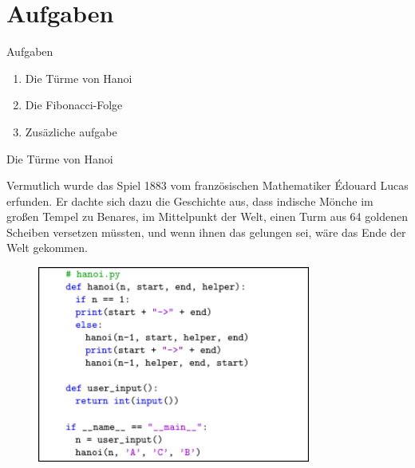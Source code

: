 \documentclass{beamer}
\begin{document}
\section{Aufgaben}
\begin{frame}{Aufgaben}
\begin{enumerate}
  \item Die Türme von Hanoi
  \item Die Fibonacci-Folge 
  \item Zusäzliche aufgabe%
\end{enumerate}
\end{frame}
\begin{frame}{Die Türme von Hanoi}
\begin{flushleft} 
    \textmd{\small
    Vermutlich wurde das Spiel 1883 vom französischen Mathematiker Édouard Lucas erfunden. 
    Er dachte sich dazu die Geschichte aus, dass indische Mönche im großen Tempel zu Benares, 
    im Mittelpunkt der Welt, einen Turm aus 64 goldenen Scheiben versetzen müssten, 
    und wenn ihnen das gelungen sei, wäre das Ende der Welt gekommen.
    }
\end{flushleft}
	
\end{frame}

\begin{frame}
\begin{figure}
    \centering
    \includegraphics[width=0.8\textwidth]{code/hanoi_code.png}
\end{figure}
\end{frame}
\end{document}
